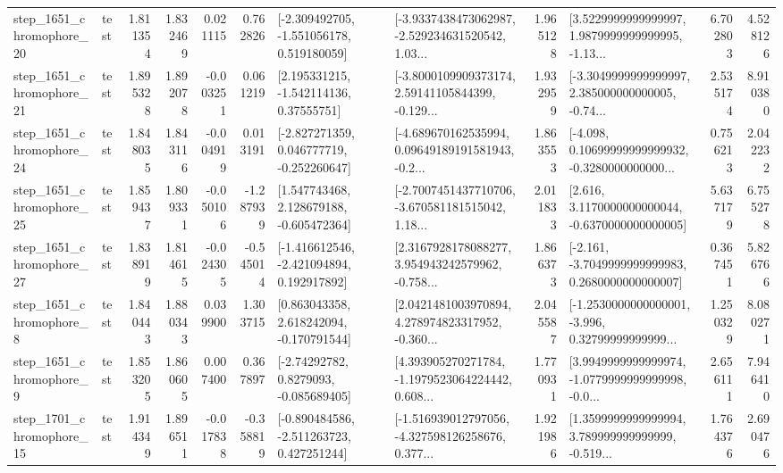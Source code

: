 \begin{tabular}{llrrrrllrlrr}
 step\_1651\_chromophore\_20 &      test &      1.811354 &    1.832469 &      0.021115 &  0.762826 &   [-2.309492705, -1.551056178, 0.519180059] &  [-3.9337438473062987, -2.529234631520542, 1.03... &       1.965128 &  [3.5229999999999997, 1.9879999999999995, -1.13... &            6.702803 &          4.528126 \\
 step\_1651\_chromophore\_21 &      test &      1.895328 &    1.892078 &     -0.003251 &  0.061219 &     [2.195331215, -1.542114136, 0.37555751] &  [-3.8000109909373174, 2.59141105844399, -0.129... &       1.932959 &  [-3.3049999999999997, 2.385000000000005, -0.74... &            2.535174 &          8.910380 \\
 step\_1651\_chromophore\_24 &      test &      1.848035 &    1.843116 &     -0.004919 &  0.013191 &   [-2.827271359, 0.046777719, -0.252260647] &  [-4.689670162535994, 0.09649189191581943, -0.2... &       1.863553 &  [-4.098, 0.10699999999999932, -0.3280000000000... &            0.756213 &          2.042232 \\
 step\_1651\_chromophore\_25 &      test &      1.859437 &    1.809331 &     -0.050106 & -1.287939 &    [1.547743468, 2.128679188, -0.605472364] &  [-2.7007451437710706, -3.670581181515042, 1.18... &       2.011833 &   [2.616, 3.1170000000000044, -0.6370000000000005] &            5.637179 &          6.755278 \\
 step\_1651\_chromophore\_27 &      test &      1.838919 &    1.814615 &     -0.024305 & -0.545014 &   [-1.416612546, -2.421094894, 0.192917892] &  [2.3167928178088277, 3.954943242579962, -0.758... &       1.866373 &  [-2.161, -3.7049999999999983, 0.2680000000000007] &            0.367451 &          5.826766 \\
  step\_1651\_chromophore\_8 &      test &      1.840443 &    1.880343 &      0.039900 &  1.303715 &    [0.863043358, 2.618242094, -0.170791544] &  [2.0421481003970894, 4.278974823317952, -0.360... &       2.045587 &  [-1.2530000000000001, -3.996, 0.32799999999999... &            1.250329 &          8.080271 \\
  step\_1651\_chromophore\_9 &      test &      1.853205 &    1.860605 &      0.007400 &  0.367897 &      [-2.74292782, 0.8279093, -0.085689405] &  [4.393905270271784, -1.1979523064224442, 0.608... &       1.770931 &  [3.9949999999999974, -1.0779999999999998, -0.0... &            2.656111 &          7.946410 \\
 step\_1701\_chromophore\_15 &      test &      1.914349 &    1.896511 &     -0.017838 & -0.358819 &   [-0.890484586, -2.511263723, 0.427251244] &  [-1.516939012797056, -4.327598126258676, 0.377... &       1.921986 &  [1.3599999999999994, 3.789999999999999, -0.519... &            1.764376 &          2.690476 \\

\end{tabular}
